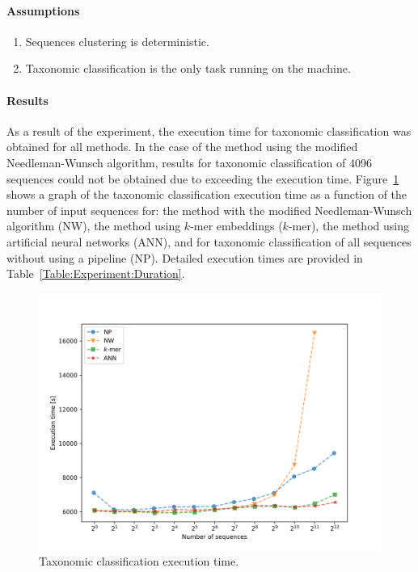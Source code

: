 \documentclass[pdflatex,sn-vancouver-num]{sn-jnl}%
\begin{document}
                \paragraph{Assumptions}
                \begin{enumerate}
                    \item {
                        Sequences clustering is deterministic.
                    }
                    \item {
                        Taxonomic classification is the only task running on the machine.
                    }
                \end{enumerate}

                \paragraph{Results}
                As a result of the experiment, the execution time for taxonomic classification was obtained for all methods. In the case of the method using the modified Needleman-Wunsch algorithm, results for taxonomic classification of 4096 sequences could not be obtained due to exceeding the execution time. Figure~\ref{Picture:Experiment:Duration} shows a graph of the taxonomic classification execution time as a function of the number of input sequences for: the method with the modified Needleman-Wunsch algorithm (NW), the method using $k$-mer embeddings ($k$-mer), the method using artificial neural networks (ANN), and for taxonomic classification of all sequences without using a pipeline (NP). Detailed execution times are provided in Table~\ref{Table:Experiment:Duration}.

                \begin{figure}[!htb]
                    \begin{center}
                        \includegraphics[width=\textwidth]{picture_experiment_duration.png}
                    \end{center}
                    \caption{
                        Taxonomic classification execution time.
                    }\label{Picture:Experiment:Duration}
                \end{figure}
\end{document}
